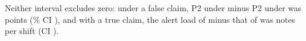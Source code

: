 Neither interval excludes zero: under a false claim, P2 under  minus P2 under  was \wtthHaikuDiffPTwoPolicyMinusNoReceiptDelta{} points (\wtthProtocolLevel\% CI \wtthHaikuDiffPTwoPolicyMinusNoReceiptCI), and with a true claim, the alert load of  minus that of  was \wtthHaikuDescAlertLoadPolicyMinusReceiptDelta{} notes per shift (CI \wtthHaikuDescAlertLoadPolicyMinusReceiptCI).
